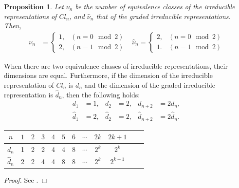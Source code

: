 \documentclass{amsart}
\newtheorem{prop}[thm]{Proposition}
\theoremstyle{definition}
\theoremstyle{remark}
\begin{document}
\begin{prop}
Let $\nu_n$ be the number of equivalence classes of the irreducible representations of $Cl_n$, and $\hat{\nu}_n$ that of the graded irreducible representations. Then, 
\begin{align*}
\nu_n&=
 \begin{cases}
    1, & (n=0 \mod 2) \\
    2,      & (n=1 \mod 2)
  \end{cases}&
\hat{\nu}_n=
\begin{cases}
    2, & (n=0 \mod 2) \\
    1.      & (n=1 \mod 2)
  \end{cases}
 \end{align*}
\end{prop}
When there are two equivalence classes of irreducible representations, their dimensions are equal.
Furthermore, if the dimension of the irreducible representation of $Cl_n$ is $d_n$ and the dimension of the graded irreducible representation is $\hat{d}_n$, then the following holds:
\begin{align*}
d_1&=1, &d_2&=2, &d_{n+2}&=2d_n,\\
\hat{d}_1&=2, &\hat{d}_2&=2, &\hat{d}_{n+2}&=2\hat{d}_n.
\end{align*}
\begin{table}[h]
    \centering
    \label{tab:hogehoge}
   \begin{tabular}{|c|c|c|c|c|c|c|c|c|c|c|c|}
        \hline
        $n$ & $1$ & $2$ & $3$ & $4$ & $5$ & $6$ & $\cdots$ & $2k$ & $2k+1$ \\ \hline
     $d_n$ & 1 & 2 & 2 & 4 & 4 & 8 & $\cdots$ & $2^k$ & $2^k$ \\ \hline
     $\hat{d}_n$ & 2 & 2 & 4 & 4 & 8 & 8 & $\cdots$ &  $ 2^k $  & $ 2^{k+1} $  \\ \hline
    \end{tabular}
\end{table}
\begin{proof}
See \cite{A-B-S}.
\end{proof}
\end{document}

